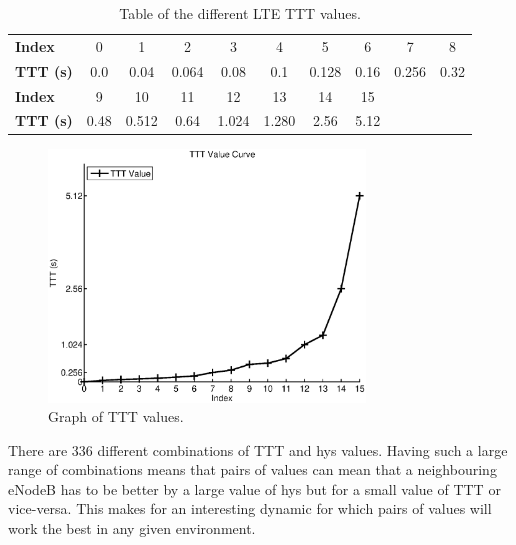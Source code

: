 \begin{table}[H]
  \begin{center}
    \begin{tabular}{| l || c | c | c | c | c | c | c | c | c |}
  	  \hline
      \textbf{Index} & 0 & 1 & 2 & 3 & 4 & 5 & 6 & 7 & 8 \\ 
      \textbf{TTT (s)} & 0.0 & 0.04 & 0.064 & 0.08 & 0.1 & 0.128 & 0.16 & 0.256 & 0.32 \\ 
      \hline
      \textbf{Index} & 9 & 10 & 11 & 12 & 13 & 14 & 15 & \multicolumn{2}{|c}{} \\
	  \textbf{TTT (s)} & 0.48 & 0.512 & 0.64 & 1.024 & 1.280 & 2.56 & 5.12 & \multicolumn{2}{|c}{} \\
      \cline{1-8}
  	\end{tabular}
  \end{center}
  \caption{Table of the different LTE TTT values.}
  \label{tab:ttt}
\end{table}
\begin{figure}[H]
  \begin{center}
    	  \includegraphics[width=0.75\textwidth]{figures/lte/TTTgraph.eps}
    \end{center}
    \caption{Graph of TTT values.}
    \label{fig:ttt}
\end{figure}
There are 336 different combinations of TTT and hys values. Having such a large range of combinations means that pairs of values can mean that a neighbouring eNodeB has to be better by a large value of hys but for a small value of TTT or vice-versa. This makes for an interesting dynamic for which pairs of values will work the best in any given environment.
